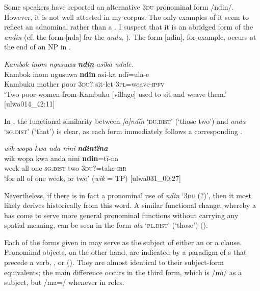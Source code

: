   Some speakers have reported an alternative 3\textsc{du} pronominal form /ndin/. However, it is not well attested in my corpus. The only examples of it seem to reflect an adnominal  rather than a . I suspect that it is an abridged form of the    \textit{andin} (cf. the form [nda] for the    \textit{anda}, ). The form [ndin], for example, occurs at the end of an NP in .

\ea%
    \label{ex:pron:1}
            \textit{Kambok inom ngusuwa} \textbf{\textit{ndin}} \textit{asika ndule.}\\
\gll    Kambok  inom  ngusuwa  \textbf{ndin}  asi-ka  ndï=ula-e\\
    Kambuku  mother  poor    3\textsc{du}?  sit-let  3\textsc{pl}=weave-\textsc{ipfv}\\
\glt `Two poor women from Kambuku [village] used to sit and weave them.’ [ulwa014\_42:11]
\z

In , the functional similarity between \textit{[a]ndin} ‘\textsc{du.dist}’ (‘those two’) and \textit{anda} ‘\textsc{sg.dist}’ (‘that’) is clear, as each form immediately follows a corresponding .

\newpage

\ea%
    \label{ex:pron:2}
         \textit{wik wopa kwa nda nini} \textbf{\textit{ndintïna}}\\
\gll wik  wopa  kwa  anda    nini  \textbf{ndin}=tï-na\\
    week  all    one    \textsc{sg.dist}  two  3\textsc{du}?=take-\textsc{irr}\\
\glt `for all of one week, or two’ (\textit{wik} = TP) [ulwa031\_00:27]
\z

Nevertheless, if there is in fact a pronominal use of \textit{ndin} ‘3\textsc{du} (?)’, then it most likely derives historically from this  word. A similar functional change, whereby a  has come to serve more general pronominal functions without carrying any spatial  meaning, can be seen in the form \textit{ala} ‘\textsc{pl.dist}’ (‘those’) ().

  Each of the forms given in  may serve as the subject of either an  or a  clause. Pronominal objects, on the other hand, are indicated by a paradigm of s that precede a verb, , or  (). They are almost identical to their subject-form equivalents; the main difference occurs in the third   form, which is /mï/ as a subject, but /ma=/ whenever in  roles.


